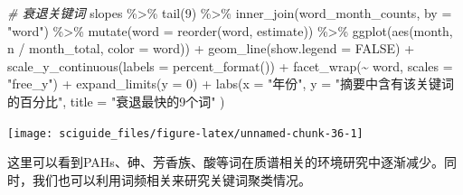 \documentclass[]{tufte-book}
\newenvironment{Shaded}{}{}
\newcommand{\AttributeTok}[1]{\textcolor[rgb]{0.49,0.56,0.16}{#1}}
\newcommand{\CommentTok}[1]{\textcolor[rgb]{0.38,0.63,0.69}{\textit{#1}}}
\newcommand{\ConstantTok}[1]{\textcolor[rgb]{0.53,0.00,0.00}{#1}}
\newcommand{\DecValTok}[1]{\textcolor[rgb]{0.25,0.63,0.44}{#1}}
\newcommand{\FunctionTok}[1]{\textcolor[rgb]{0.02,0.16,0.49}{#1}}
\newcommand{\NormalTok}[1]{#1}
\newcommand{\SpecialCharTok}[1]{\textcolor[rgb]{0.25,0.44,0.63}{#1}}
\newcommand{\StringTok}[1]{\textcolor[rgb]{0.25,0.44,0.63}{#1}}
\begin{document}
\begin{Shaded}
\begin{Highlighting}[]
\CommentTok{\# 衰退关键词}
\NormalTok{slopes }\SpecialCharTok{\%\textgreater{}\%}
  \FunctionTok{tail}\NormalTok{(}\DecValTok{9}\NormalTok{) }\SpecialCharTok{\%\textgreater{}\%}
  \FunctionTok{inner\_join}\NormalTok{(word\_month\_counts, }\AttributeTok{by =} \StringTok{"word"}\NormalTok{) }\SpecialCharTok{\%\textgreater{}\%}
  \FunctionTok{mutate}\NormalTok{(}\AttributeTok{word =} \FunctionTok{reorder}\NormalTok{(word, estimate)) }\SpecialCharTok{\%\textgreater{}\%}
  \FunctionTok{ggplot}\NormalTok{(}\FunctionTok{aes}\NormalTok{(month, n }\SpecialCharTok{/}\NormalTok{ month\_total, }\AttributeTok{color =}\NormalTok{ word)) }\SpecialCharTok{+}
  \FunctionTok{geom\_line}\NormalTok{(}\AttributeTok{show.legend =} \ConstantTok{FALSE}\NormalTok{) }\SpecialCharTok{+}
  \FunctionTok{scale\_y\_continuous}\NormalTok{(}\AttributeTok{labels =} \FunctionTok{percent\_format}\NormalTok{()) }\SpecialCharTok{+}
  \FunctionTok{facet\_wrap}\NormalTok{(}\SpecialCharTok{\textasciitilde{}}\NormalTok{ word, }\AttributeTok{scales =} \StringTok{"free\_y"}\NormalTok{) }\SpecialCharTok{+}
  \FunctionTok{expand\_limits}\NormalTok{(}\AttributeTok{y =} \DecValTok{0}\NormalTok{) }\SpecialCharTok{+}
  \FunctionTok{labs}\NormalTok{(}\AttributeTok{x =} \StringTok{"年份"}\NormalTok{,}
       \AttributeTok{y =} \StringTok{"摘要中含有该关键词的百分比"}\NormalTok{,}
       \AttributeTok{title =} \StringTok{"衰退最快的9个词"}
\NormalTok{              )}
\end{Highlighting}
\end{Shaded}

\texttt{[image: sciguide\_files/figure-latex/unnamed-chunk-36-1]}

这里可以看到PAHs、砷、芳香族、酸等词在质谱相关的环境研究中逐渐减少。同时，我们也可以利用词频相关来研究关键词聚类情况。
\end{document}
